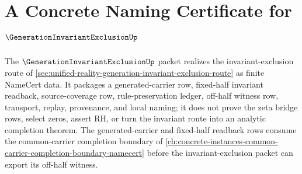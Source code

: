 \chapter{A Concrete Naming Certificate for $\GenerationInvariantExclusionUp$}
\label{ch:concrete-instances-generation-invariant-exclusion-namecert}

The $\GenerationInvariantExclusionUp$ packet realizes the invariant-exclusion route of \autoref{sec:unified-reality-generation-invariant-exclusion-route} as finite NameCert data. It packages a generated-carrier row, fixed-half invariant readback, source-coverage row, rule-preservation ledger, off-half witness row, transport, replay, provenance, and local naming; it does not prove the zeta bridge rows, select zeros, assert RH, or turn the invariant route into an analytic completion theorem. The generated-carrier and fixed-half readback rows consume the common-carrier completion boundary of \autoref{ch:concrete-instances-common-carrier-completion-boundary-namecert} before the invariant-exclusion packet can export its off-half witness.

